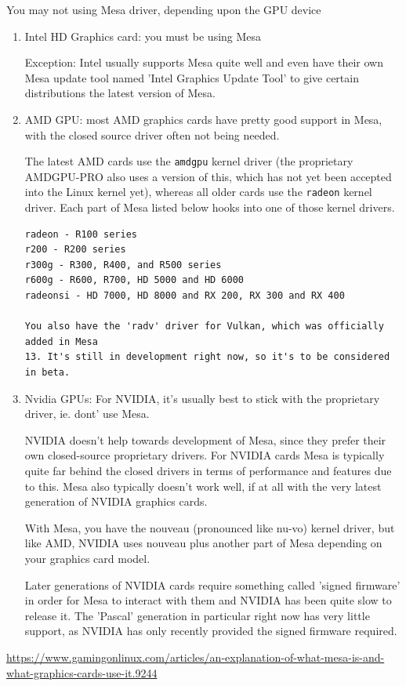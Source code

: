 You may not using Mesa driver, depending upon the GPU device
\begin{enumerate}
  \item Intel HD Graphics card: you must be using Mesa

Exception: Intel usually supports Mesa quite well and even have their own Mesa
update tool named 'Intel Graphics Update Tool' to give certain distributions
the latest version of Mesa. 
 
  \item AMD GPU:   most AMD graphics cards have pretty good support in Mesa,
  with the closed source driver often not being needed.

The latest AMD cards use the \verb!amdgpu! kernel driver (the proprietary
AMDGPU-PRO also uses a version of this, which has not yet been accepted into the
Linux kernel yet), whereas all older cards use the \verb!radeon! kernel driver.
Each part of Mesa listed below hooks into one of those kernel drivers.

\begin{verbatim}
radeon - R100 series
r200 - R200 series
r300g - R300, R400, and R500 series
r600g - R600, R700, HD 5000 and HD 6000
radeonsi - HD 7000, HD 8000 and RX 200, RX 300 and RX 400

You also have the 'radv' driver for Vulkan, which was officially added in Mesa
13. It's still in development right now, so it's to be considered in beta.  
\end{verbatim}
  
  \item Nvidia GPUs: For NVIDIA, it's usually best to stick with the proprietary
  driver, ie. dont' use Mesa. 

 
  NVIDIA doesn't help towards development of Mesa, since they prefer their own
  closed-source proprietary drivers. For NVIDIA cards Mesa is typically quite
  far behind the closed drivers in terms of performance and features due to
  this. Mesa also typically doesn't work well, if at all with the very latest
  generation of NVIDIA graphics cards.   



With Mesa, you have the nouveau (pronounced like nu-vo) kernel driver, but like
AMD, NVIDIA uses nouveau plus another part of Mesa depending on your graphics
card model.

Later generations of NVIDIA cards require something called 'signed firmware' in
order for Mesa to interact with them and NVIDIA has been quite slow to release
it. The 'Pascal' generation in particular right now has very little support, as
NVIDIA has only recently provided the signed firmware required.
  
\end{enumerate}
\url{https://www.gamingonlinux.com/articles/an-explanation-of-what-mesa-is-and-what-graphics-cards-use-it.9244}

